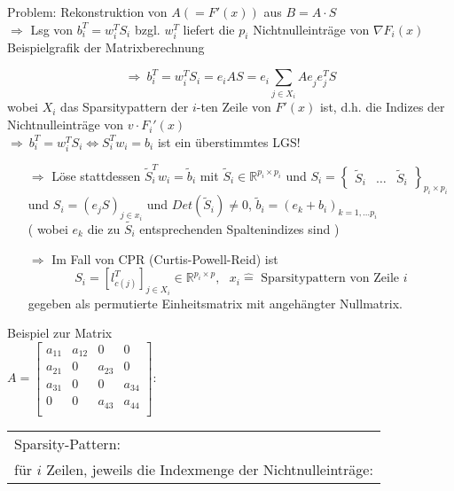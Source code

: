 \noindent
Problem: Rekonstruktion von $A (=F'(x))$ aus $B=A\cdot S$\\
$\Rightarrow$ Lsg von $b_i^T = w_i^TS_i$ bzgl. $w_i^T$ liefert die $p_i$ Nichtnulleinträge von $\nabla F_i(x)$\\
Beispielgrafik der Matrixberechnung\\
\vspace{3cm}


$$\Rightarrow\ b_i^T =w_i^TS_i = e_i A S = e_i \sum_{j \in X_i} Ae_j^{}e_j^TS$$
wobei  $X_i$ das Sparsitypattern der $i$-ten Zeile von $F'(x)$ ist, d.h. die Indizes der Nichtnulleinträge von $v\cdot F_i'(x)$\\
$\Rightarrow\ b_i^T =w_i^TS_i \Leftrightarrow S_i^Tw_i = b_i$ ist ein überstimmtes LGS!\\

\begin{itemize}
	\item[$\Rightarrow$] Löse stattdessen $\tilde{S}_i^Tw_i = \tilde{b}_i$
	mit
	$\tilde{S}_i \in \mathbb{R}^{p_i\times p_i}$
	und
	$S_i = \begin{Bmatrix}
	\tilde{S}_i & \dots & \tilde{S}_i\end{Bmatrix}_{p_i \times p_i}$ und  $S_i= (e_jS)_{j \in x_i}$
	und
	$Det(\tilde{S}_i)\neq 0$, $\tilde{b}_i = (e_k+b_i)_{k=1,\dots p_i}$\\
	( wobei
	$e_k$ die zu $\tilde{S_i}$ entsprechenden Spaltenindizes sind )\\
	
	\item[$\Rightarrow$] Im Fall von CPR (Curtis-Powell-Reid) ist\\
	$$S_i = \left[l^T_{c(j)}\right]_{j\in X_i}\in \mathbb{R}^{p_i\times p},\ \ \ x_i \hat{=} \text{ Sparsitypattern von Zeile } i$$
	gegeben als permutierte Einheitsmatrix mit angehängter Nullmatrix.
	
\end{itemize}
\noindent
Beispiel zur Matrix\\
$A=\begin{bmatrix}
a_{11}	& a_{12}	& 0	& 0	\\
a_{21}	& 0	& a_{23}	& 0	\\
a_{31}	& 0	& 0	& a_{34}	\\
0	& 0	& a_{43}	& a_{44}\\
\end{bmatrix}$:
\begin{tabular}{l}
	Sparsity-Pattern:\\
	für $i$ Zeilen, jeweils die Indexmenge der Nichtnulleinträge:
\end{tabular}\\
